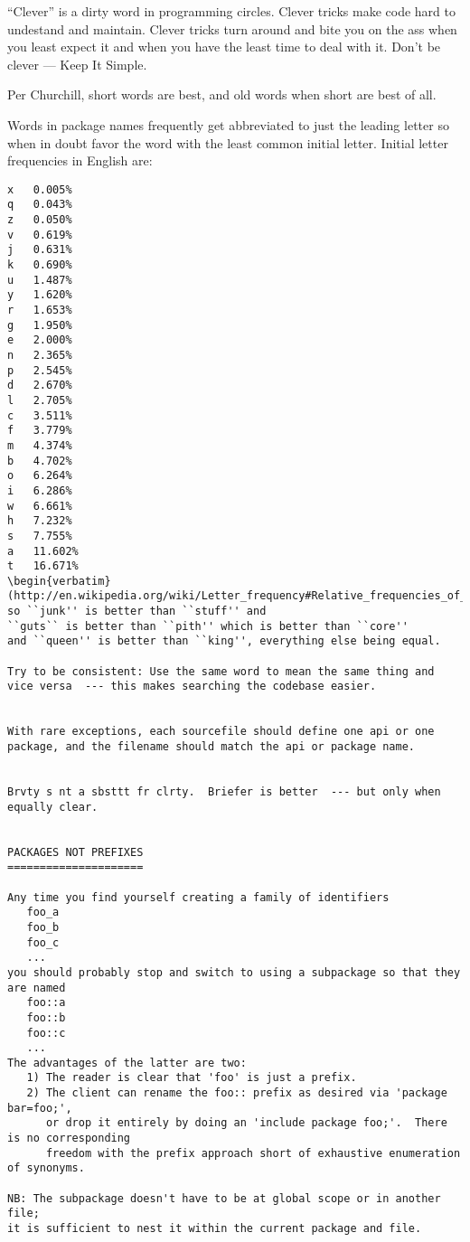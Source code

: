 ``Clever'' is a dirty word in programming circles.  Clever tricks 
make code hard to undestand and maintain.  Clever tricks turn around 
and bite you on the ass when you least expect it and when you have the 
least time to deal with it.  Don't be clever  --- Keep It Simple.


Per Churchill, short words are best, and old words when short are best of all.

Words in package names frequently get abbreviated to just the leading letter so 
when in doubt favor the word with the least common initial letter.  Initial letter frequencies in English 
are:
\begin{verbatim}
x	0.005%
q	0.043%
z	0.050%
v	0.619%
j	0.631%
k	0.690%
u	1.487%
y	1.620%
r	1.653%
g	1.950%
e	2.000%
n	2.365%
p	2.545%
d	2.670%
l	2.705%
c	3.511%
f	3.779%
m	4.374%
b	4.702%
o	6.264%
i	6.286%
w	6.661%
h	7.232%
s	7.755%
a	11.602%
t	16.671%
\begin{verbatim}
(http://en.wikipedia.org/wiki/Letter_frequency#Relative_frequencies_of_the_first_letters_of_a_word_in_the_English_language)
so ``junk'' is better than ``stuff'' and
``guts`` is better than ``pith'' which is better than ``core''
and ``queen'' is better than ``king'', everything else being equal.

Try to be consistent: Use the same word to mean the same thing and 
vice versa  --- this makes searching the codebase easier.


With rare exceptions, each sourcefile should define one api or one package, and the filename should match the api or package name.


Brvty s nt a sbsttt fr clrty.  Briefer is better  --- but only when equally clear.


PACKAGES NOT PREFIXES
=====================

Any time you find yourself creating a family of identifiers 
   foo_a
   foo_b
   foo_c
   ...
you should probably stop and switch to using a subpackage so that they are named 
   foo::a
   foo::b
   foo::c
   ...
The advantages of the latter are two:
   1) The reader is clear that 'foo' is just a prefix.
   2) The client can rename the foo:: prefix as desired via 'package bar=foo;',
      or drop it entirely by doing an 'include package foo;'.  There is no corresponding 
      freedom with the prefix approach short of exhaustive enumeration of synonyms.

NB: The subpackage doesn't have to be at global scope or in another file;
it is sufficient to nest it within the current package and file.


\end{verbatim}
